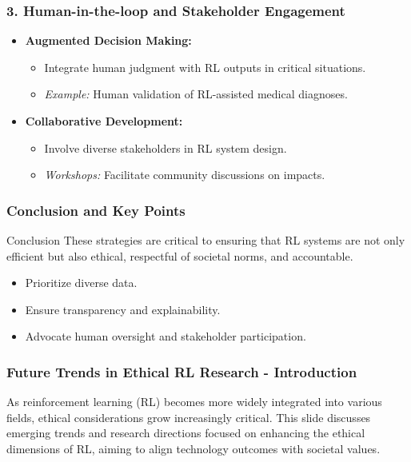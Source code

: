 \documentclass{beamer}
\begin{document}
\begin{frame}[fragile]
    \frametitle{3. Human-in-the-loop and Stakeholder Engagement}
    \begin{itemize}
        \item \textbf{Augmented Decision Making:}
        \begin{itemize}
            \item Integrate human judgment with RL outputs in critical situations.
            \item \textit{Example:} Human validation of RL-assisted medical diagnoses.
        \end{itemize}

        \item \textbf{Collaborative Development:}
        \begin{itemize}
            \item Involve diverse stakeholders in RL system design.
            \item \textit{Workshops:} Facilitate community discussions on impacts.
        \end{itemize}
    \end{itemize}
\end{frame}

\begin{frame}[fragile]
    \frametitle{Conclusion and Key Points}
    \begin{block}{Conclusion}
        These strategies are critical to ensuring that RL systems are not only efficient but also ethical, respectful of societal norms, and accountable.
    \end{block}
    
    \begin{itemize}
        \item Prioritize diverse data.
        \item Ensure transparency and explainability.
        \item Advocate human oversight and stakeholder participation.
    \end{itemize}
\end{frame}

\begin{frame}[fragile]
    \frametitle{Future Trends in Ethical RL Research - Introduction}
    As reinforcement learning (RL) becomes more widely integrated into various fields, ethical considerations grow increasingly critical. 
    This slide discusses emerging trends and research directions focused on enhancing the ethical dimensions of RL, aiming to align technology outcomes with societal values.
\end{frame}
\end{document}
